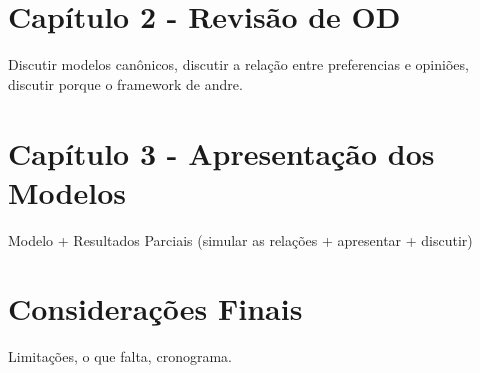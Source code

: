 \documentclass{article}
\begin{document}
\section*{Capítulo 2 - Revisão de OD }

Discutir modelos canônicos, discutir a relação entre preferencias e opiniões,
discutir porque o framework de andre.


\section*{Capítulo 3 - Apresentação dos Modelos}

Modelo + Resultados Parciais (simular as relações + apresentar + discutir)




\section*{Considerações Finais}

Limitações, o que falta, cronograma.
\end{document}
